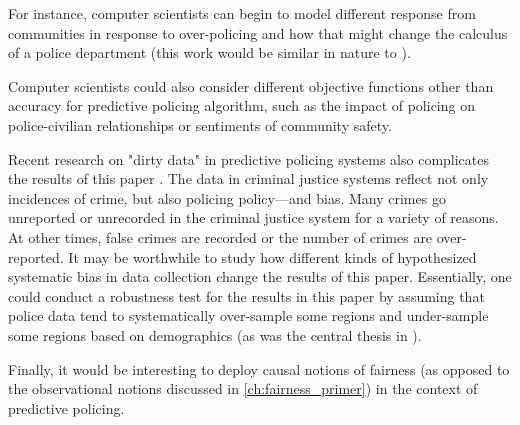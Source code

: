 For instance, computer scientists can begin to model different response from communities in response to over-policing and how that might change the calculus of a police department (this work would be similar in nature to \citet{liu_delayed_2018}).

Computer scientists could also consider different objective functions other than accuracy for predictive policing algorithm, such as the impact of policing on police-civilian relationships or sentiments of community safety.

Recent research on "dirty data" in predictive policing systems also complicates the results of this paper \citep{richardson_dirty_2019}. The data in criminal justice systems reflect not only incidences of crime, but also policing policy---and bias. Many crimes go unreported or unrecorded in the criminal justice system for a variety of reasons. At other times, false crimes are recorded or the number of crimes are over-reported. It may be worthwhile to study how different kinds of hypothesized systematic bias in data collection change the results of this paper. Essentially, one could conduct a robustness test for the results in this paper by assuming that police data tend to systematically over-sample some regions and under-sample some regions based on demographics (as was the central thesis in \citet{lum_predict_2016}).

Finally, it would be interesting to deploy causal notions of fairness (as opposed to the observational notions discussed in \autoref{ch:fairness_primer}) in the context of predictive policing.